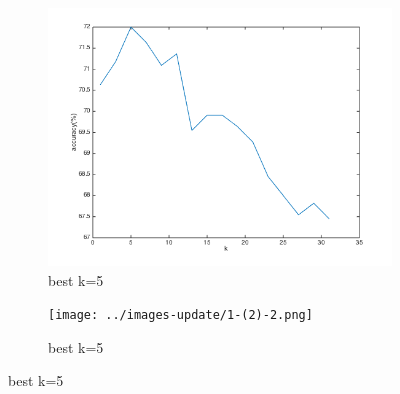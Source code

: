 \documentclass[]{article}
\begin{document}
\begin{figure}[h!]
	\centering
	\begin{subfigure}{.49\textwidth}
		\centering
		\includegraphics[width=1\linewidth]{../images-update/1-(2)-1.png}
		\caption{best k=5}
	\end{subfigure}
	\begin{subfigure}{.49\textwidth}
		\centering
		\texttt{[image: ../images-update/1-(2)-2.png]}
		\caption{best k=5}
		\label{fig:sub1}
	\end{subfigure}


\end{figure}
\end{document}
